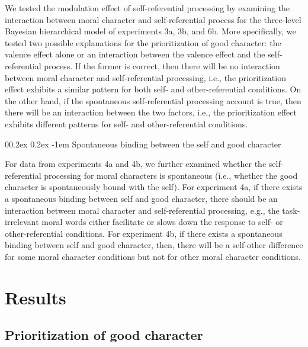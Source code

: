 \documentclass[
  man]{apa6}
\makeatletter
\let\oldparagraph\paragraph
\renewcommand{\paragraph}[1]{\oldparagraph{#1}\mbox{}}
\renewcommand{\paragraph}{\@startsection{paragraph}{4}{\parindent}%
  {0\baselineskip \@plus 0.2ex \@minus 0.2ex}%
  {-1em}%
  {\normalfont\normalsize\bfseries\itshape\typesectitle}}
\makeatother
\begin{document}
We tested the modulation effect of self-referential processing by examining the interaction between moral character and self-referential process for the three-level Bayesian hierarchical model of experiments 3a, 3b, and 6b. More specifically, we tested two possible explanations for the prioritization of good character: the valence effect alone or an interaction between the valence effect and the self-referential process. If the former is correct, then there will be no interaction between moral character and self-referential processing, i.e., the prioritization effect exhibits a similar pattern for both self- and other-referential conditions. On the other hand, if the spontaneous self-referential processing account is true, then there will be an interaction between the two factors, i.e., the prioritization effect exhibits different patterns for self- and other-referential conditions.

\hypertarget{spontaneous-binding-between-the-self-and-good-character}{%
\paragraph{Spontaneous binding between the self and good character}\label{spontaneous-binding-between-the-self-and-good-character}}

For data from experiments 4a and 4b, we further examined whether the self-referential processing for moral characters is spontaneous (i.e., whether the good character is spontaneously bound with the self). For experiment 4a, if there exists a spontaneous binding between self and good character, there should be an interaction between moral character and self-referential processing, e.g., the task-irrelevant moral words either facilitate or slows down the response to self- or other-referential conditions. For experiment 4b, if there exists a spontaneous binding between self and good character, then, there will be a self-other difference for some moral character conditions but not for other moral character conditions.

\hypertarget{results}{%
\section{Results}\label{results}}

\hypertarget{prioritization-of-good-character}{%
\subsection{Prioritization of good character}\label{prioritization-of-good-character}}
\end{document}
